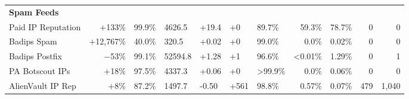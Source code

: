\begin{table}[t!]
\begin{tabular}{l r H H H H H r r r r }
 \textbf{Spam Feeds} \\
Paid IP Reputation 	 & $+$133\%	     & 99.9\%      & 4626.5    & +19.4   & +0      & 89.7\%  & 59.3\%    & 78.7\% & 0   & 0\\
Badips Spam 	     & $+$12,767\%    & 40.0\%      & 320.5     & +0.02   & +0      & 99.0\% 	& 0.0\%     & 0.02\% & 0   & 0 \\
Badips Postfix 	     & $-$53\%       & 99.1\%      & 52594.8   & +1.28   & +1      & 96.6\%  & <0.01\%   & 1.29\% & 0   & 1\\
PA Botscout IPs 	 & $+$18\%	     & 97.5\% 	  & 4337.3    & +0.06   & +0      & >99.9\%	& 0.0\%     & 0.06\% & 0   & 0 \\
AlienVault IP Rep 	 & $+$8\%	    & 87.2\% 	  & 1497.7    & -0.50   & +561    & 98.8\% 	& 0.57\%	& 0.07\% & 479  & 1,040 \\


\bottomrule
\end{tabular}
\end{table}



